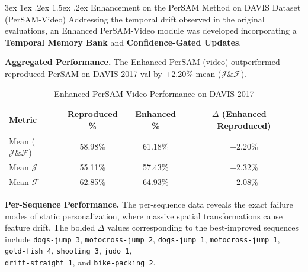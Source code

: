 \documentclass[journal,12pt,onecolumn,draftclsnofoot]{IEEEtran}
\makeatletter
\renewcommand{\subsection}{\@startsection{subsection}{2}{\z@}%
    {3ex \@plus 1ex \@minus .2ex}%
    {1.5ex \@plus.2ex}%
    {\normalfont\large\bfseries}}
\makeatother
\begin{document}
\subsection{Enhancement on the PerSAM Method on DAVIS Dataset (PerSAM-Video)}
Addressing the temporal drift observed in the original evaluations, an Enhanced PerSAM-Video module was developed incorporating a \textbf{Temporal Memory Bank} and \textbf{Confidence-Gated Updates}.

\textbf{Aggregated Performance.} The Enhanced PerSAM (video) outperformed reproduced PerSAM on DAVIS-2017 val by +2.20\% mean ($\mathcal{J}\&\mathcal{F}$).

\begin{table}[htbp]
\centering
\caption{Enhanced PerSAM-Video Performance on DAVIS 2017}
\label{tab:enh_persam_video_agg}
\begin{tabular}{l c c c}
\toprule
\textbf{Metric} & \textbf{Reproduced \%} & \textbf{Enhanced \%} & \textbf{$\Delta$ (Enhanced $-$ Reproduced)} \\
\midrule
Mean ($\mathcal{J}\&\mathcal{F}$) & 58.98\% & 61.18\% & +2.20\% \\
Mean $\mathcal{J}$ & 55.11\% & 57.43\% & +2.32\% \\
Mean $\mathcal{F}$ & 62.85\% & 64.93\% & +2.08\% \\
\bottomrule
\end{tabular}
\end{table}

\textbf{Per-Sequence Performance.} The per-sequence data reveals the exact failure modes of static personalization, where massive spatial transformations cause feature drift. The bolded $\Delta$ values corresponding to the best-improved sequences include \texttt{dogs-jump\_3}, \texttt{motocross-jump\_2}, \texttt{dogs-jump\_1}, \texttt{motocross-jump\_1}, \texttt{gold-fish\_4}, \texttt{shooting\_3}, \texttt{judo\_1},
\\ \texttt{drift-straight\_1}, and \texttt{bike-packing\_2}.
\end{document}
